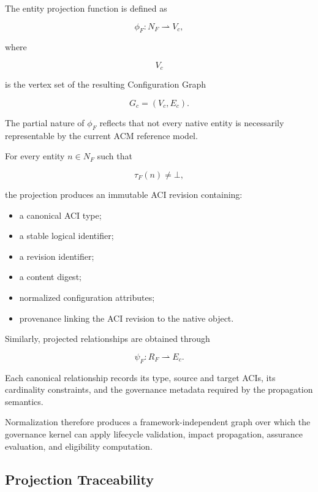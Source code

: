 \documentclass[10pt]{article}
\begin{document}
The entity projection function is defined as

\begin{equation}
	\phi_F :
	N_F
	\rightharpoonup
	V_c,
\end{equation}

where

\[
V_c
\]

is the vertex set of the resulting Configuration Graph

\[
G_c=(V_c,E_c).
\]

The partial nature of $\phi_F$ reflects that not every native entity is
necessarily representable by the current ACM reference model.

For every entity $n\in N_F$ such that

\[
\tau_F(n)\neq\bot,
\]

the projection produces an immutable ACI revision containing:

\begin{itemize}
	\item a canonical ACI type;
	\item a stable logical identifier;
	\item a revision identifier;
	\item a content digest;
	\item normalized configuration attributes;
	\item provenance linking the ACI revision to the native object.
\end{itemize}

Similarly, projected relationships are obtained through

\begin{equation}
	\psi_F :
	R_F
	\rightharpoonup
	E_c.
\end{equation}

Each canonical relationship records its type, source and target ACIs, its
cardinality constraints, and the governance metadata required by the
propagation semantics.

Normalization therefore produces a framework-independent graph over which the
governance kernel can apply lifecycle validation, impact propagation, assurance
evaluation, and eligibility computation.

\subsection{Projection Traceability}
\end{document}
